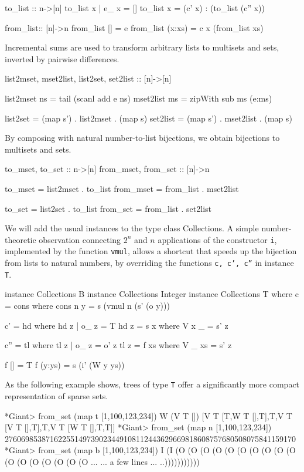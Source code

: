 \documentclass{TOOLS/llncs}
\begin{document}
\begin{code}
  to_list :: n->[n]
  to_list x | e_ x = []
  to_list x = (c' x) : (to_list (c'' x))

  from_list:: [n]->n
  from_list [] = e
  from_list (x:xs) = c x (from_list xs)
\end{code}
Incremental sums are used to transform arbitrary
lists to multisets and sets, inverted by pairwise differences.
\begin{code}  
  list2mset, mset2list, list2set, set2list :: [n]->[n]
 
  list2mset ns = tail (scanl add e ns)
  mset2list ms =  zipWith sub ms (e:ms)
    
  list2set = (map s') . list2mset . (map s)
  set2list = (map s') . mset2list . (map s) 
\end{code}
By composing with natural number-to-list bijections, we obtain bijections
to multisets and sets.
\begin{code}  
  to_mset, to_set :: n->[n]
  from_mset, from_set :: [n]->n

  to_mset = list2mset . to_list
  from_mset = from_list . mset2list
  
  to_set = list2set . to_list
  from_set = from_list . set2list
\end{code}
We will add the usual instances to the type class Collections. 
A simple number-theoretic observation connecting $2^{n}$ and $n$ 
applications of the constructor {\tt i}, implemented by the 
function {\tt vmul}, allows a shortcut that speeds up the 
bijection from lists to natural numbers, by overriding the 
functions {\tt c, c', c''} in instance {\tt T}. 
\begin{code}
instance Collections B
instance Collections Integer
instance Collections T where
  c = cons where
    cons n y = s (vmul n (s' (o y)))
    
  c' = hd where  
    hd z | o_ z = T
    hd z = s x where
      V x _ = s' z
      
  c'' = tl where
    tl z | o_ z = o' z 
    tl z = f xs where
      V _ xs = s' z
 
      f [] = T
      f (y:ys) = s (i' (W y ys))
 
\end{code}
As the following example shows, trees of type {\tt T} offer a significantly more compact
representation of sparse sets.
\begin{codex}
*Giant> from_set (map t [1,100,123,234])
W (V T []) [V T [T,W T [],T],T,V T [V T [],T],T,V T [W T [],T,T]]
*Giant> from_set (map n [1,100,123,234])
27606985387162255149739023449108112443629669818608757680508075841159170
*Giant> from_set (map b [1,100,123,234])
I (I (O (O (O (O (O (O (O (O (O (O (O (O (O (O (O (O (O ...
... a few lines ...
..)))))))))))
\end{codex}
\end{document}
